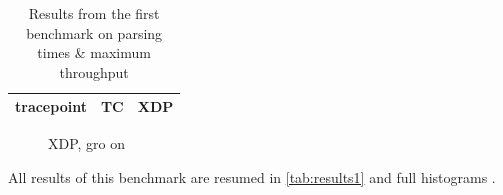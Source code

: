 \documentclass[conference]{IEEEtran}
\begin{document}
\begin{table}
    \caption{Results from the first benchmark on parsing times \& maximum throughput} \label{tab:results1}
    \centering
    \begin{tabular}{ccc}
        \toprule
        tracepoint & TC & XDP \\
        \midrule
        \bottomrule
    \end{tabular}
\end{table}

\begin{figure}[t]
    \caption{Comparison of the time passed in eBPF script per packet} \label{fig:results1}
    \centering
    \begin{minipage}{0.48\linewidth}
        \centering
        \def\svgwidth{\linewidth}
        
        \caption{TC, gro off}
    \end{minipage}
    \begin{minipage}{0.48\linewidth}
        \centering
        \def\svgwidth{\linewidth}
        
        \caption{TC, gro on}
    \end{minipage}
    \vspace{0.5em}
    
        \begin{minipage}{0.48\linewidth}
        \centering
        \def\svgwidth{\linewidth}
        
        \caption{XDP, gro off}
    \end{minipage}
    \begin{minipage}{0.48\linewidth}
        \centering
        \def\svgwidth{\linewidth}
        
        \caption{XDP, gro on}
    \end{minipage}
\end{figure}


All results of this benchmark are resumed in \autoref{tab:results1} and full histograms . %
\end{document}
